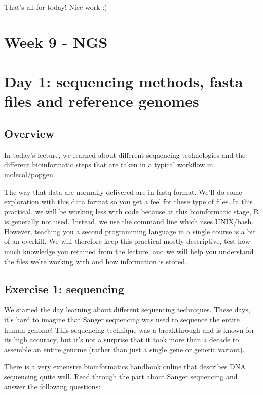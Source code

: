 \documentclass[
  letterpaper,
  DIV=11,
  numbers=noendperiod]{scrreprt}
\begin{document}
That's all for today! Nice work :)


\chapter{Week 9 - NGS}\label{week-9---ngs}


\chapter{Day 1: sequencing methods, fasta files and reference
genomes}\label{day-1-sequencing-methods-fasta-files-and-reference-genomes}

\section{Overview}\label{overview-1}

In today's lecture, we learned about different sequencing technologies
and the different bioinformatic steps that are taken in a typical
workflow in molecol/popgen.

The way that data are normally delivered are in fastq format. We'll do
some exploration with this data format so you get a feel for these type
of files. In this practical, we will be working less with code because
at this bioinformatic stage, R is generally not used. Instead, we use
the command line which uses UNIX/bash. However, teaching you a second
programming language in a single course is a bit of an overkill. We will
therefore keep this practical mostly descriptive, test how much
knowledge you retained from the lecture, and we will help you understand
the files we're working with and how information is stored.

\section{Exercise 1: sequencing}\label{exercise-1-sequencing}

We started the day learning about different sequencing techniques. These
days, it's hard to imagine that Sanger sequencing was used to sequence
the entire human genome! This sequencing technique was a breakthrough
and is known for its high accuracy, but it's not a surprise that it took
more than a decade to assemble an entire genome (rather than just a
single gene or genetic variant).

There is a very extensive bioinformatics handbook online that describes
DNA sequencing quite well. Read through the part about
\href{https://eriqande.github.io/eca-bioinf-handbook/dna-sequences-and-sequencing.html\#sanger-sequencing}{Sanger
sequencing} and answer the following questions:
\end{document}
